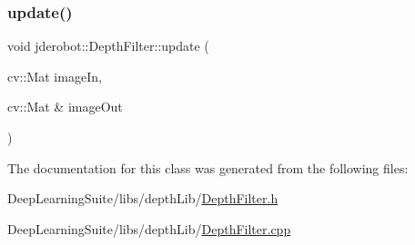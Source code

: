 \subsubsection{\texorpdfstring{update()}{update()}}
{\footnotesize\ttfamily void jderobot\+::\+Depth\+Filter\+::update (\begin{DoxyParamCaption}\item[{cv\+::\+Mat}]{image\+In,  }\item[{cv\+::\+Mat \&}]{image\+Out }\end{DoxyParamCaption})}



The documentation for this class was generated from the following files\+:\begin{DoxyCompactItemize}
\item 
Deep\+Learning\+Suite/libs/depth\+Lib/\hyperlink{_depth_filter_8h}{Depth\+Filter.\+h}\item 
Deep\+Learning\+Suite/libs/depth\+Lib/\hyperlink{_depth_filter_8cpp}{Depth\+Filter.\+cpp}\end{DoxyCompactItemize}
